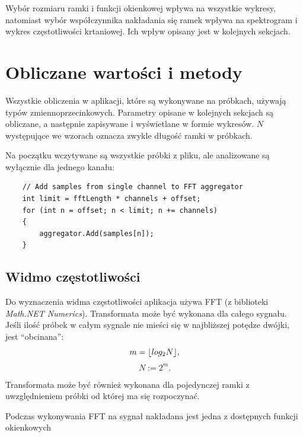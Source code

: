 \documentclass[12pt,a4paper]{article}
\DeclarePairedDelimiter\floor{\lfloor}{\rfloor}
\begin{document}
        Wybór rozmiaru ramki i funkcji okienkowej wpływa na wszystkie wykresy, natomiast wybór współczynnika nakładania się ramek wpływa na spektrogram i wykres częstotliwości krtaniowej. Ich wpływ opisany jest w kolejnych sekcjach.

\section{Obliczane wartości i metody\label{sec:wartosci}}
    Wszystkie obliczenia w aplikacji, które są wykonywane na próbkach, używają typów zmiennoprzecinkowych. Parametry opisane w kolejnych sekcjach są obliczane, a następnie zapisywane i wyświetlane w formie wykresów. $N$ występujące we wzorach oznacza zwykle długość ramki w próbkach.

    Na początku wczytywane są wszystkie próbki z pliku, ale analizowane są wyłącznie dla jednego kanału:

    \begin{verbatim}
    // Add samples from single channel to FFT aggregator
    int limit = fftLength * channels + offset;
    for (int n = offset; n < limit; n += channels)
    {
        aggregator.Add(samples[n]);
    }
    \end{verbatim}

    \subsection{Widmo częstotliwości\label{sec:widmo}}
        Do wyznaczenia widma częstotliwości aplikacja używa FFT (z biblioteki \emph{Math.NET Numerics}). Transformata może być wykonana dla całego sygnału. Jeśli ilość próbek w całym sygnale nie mieści się w najbliższej potędze dwójki, jest ``obcinana'':
        \begin{equation*}
            m=\floor*{log_2{N}},
        \end{equation*}
        \begin{equation*}
            N:=2^m.
        \end{equation*}

        Transformata może być również wykonana dla pojedynczej ramki z uwzględnieniem próbki od której ma się rozpoczynać.

        Podczas wykonywania FFT na sygnał nakładana jest jedna z dostępnych funkcji okienkowych
\end{document}
